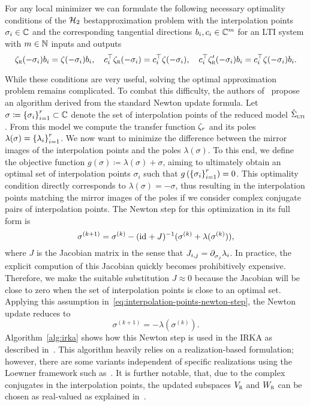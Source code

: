 For any local minimizer we can formulate the following necessary optimality conditions of the $\mcl{H}_2$ bestapproximation problem with the interpolation points $\sigma_i \in \bb{C}$ and the corresponding tangential directions $b_i, c_i \in \bb{C}^{m}$ for an \ac{LTI} system with $m \in \bb{N}$ inputs and outputs
\begin{equation}\label{eq:h2-optimality-conditions}
    \tfunc_\msc{r}(- \sigma_i) b_i = \tfunc(- \sigma_i) b_i,\quad c_i\trans \tfunc_\msc{r}(- \sigma_i) = c_i\trans \tfunc(- \sigma_i),\quad c_i\trans \tfunc'_\msc{r}(- \sigma_i) b_i = c_i\trans \tfunc(- \sigma_i) b_i.
\end{equation}

While these conditions are very useful, solving the optimal approximation problem remains complicated.
To combat this difficulty, the authors of~\cite{Gugercin2008} propose an algorithm derived from the standard Newton update formula.
Let $\sigma \coloneqq {\sset{\sigma_i}}_{i = 1}^r \subset \bb{C}$ denote the set of interpolation points of the reduced model $\hat{\Sigma}_\msc{lti}$.
From this model we compute the transfer function $\tfunc_r$ and its poles $\lambda(\sigma) = {\sset{\lambda_i}}_{i = 1}^r$.
We now want to minimize the difference between the mirror images of the interpolation points and the poles $\lambda(\sigma)$.
To this end, we define the objective function $g(\sigma) \coloneqq \lambda(\sigma) + \sigma$, aiming to ultimately obtain an optimal set of interpolation points $\sigma_i$ such that $g\left( {\sset{\sigma_i}}_{i = 1}^r \right) = 0$.
This optimality condition directly corresponds to $\lambda(\sigma) = -\sigma$, thus resulting in the interpolation points matching the mirror images of the poles if we consider complex conjugate pairs of interpolation points.
The Newton step for this optimization in its full form is
\begin{equation}\label{eq:interpolation-points-newton-step}
    \sigma^{(k + 1)} = \sigma^{(k)} - (\id + J)\inv (\sigma^{(k)} + \lambda(\sigma^{(k)})),
\end{equation}
where $J$ is the Jacobian matrix in the sense that $J_{i, j} = \pd[\sigma_j]{} \lambda_i$.
In practice, the explicit compution of this Jacobian quickly becomes prohibitively expensive.
Therefore, we make the suitable substitution $J \approx 0$ because the Jacobian will be close to zero when the set of interpolation points is close to an optimal set.
Applying this assumption in~\eqref{eq:interpolation-points-newton-step}, the Newton update reduces to
\begin{equation*}
    \sigma^{(k + 1)} = - \lambda(\sigma^{(k)}).
\end{equation*}
Algorithm~\ref{alg:irka} shows how this Newton step is used in the \acf{IRKA} as described in~\cite[Algorithm~4.1]{Gugercin2008}.
This algorithm heavily relies on a realization-based formulation; however, there are some variants independent of specific realizations using the Loewner framework such as~\cite[Algorithm~7.2]{Beattie2017}.
It is further notable, that, due to the complex conjugates in the interpolation points, the updated subspaces $V_\msc{r}$ and $W_\msc{r}$ can be chosen as real-valued as explained in~\cite[Remark~4]{Gugercin2012}.

